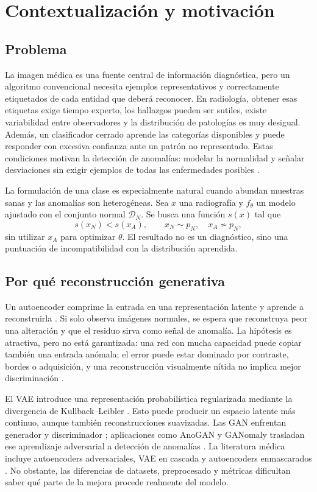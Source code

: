 \section{Contextualización y motivación}

\subsection{Problema}

La imagen médica es una fuente central de información diagnóstica, pero un
algoritmo convencional necesita ejemplos representativos y correctamente
etiquetados de cada entidad que deberá reconocer. En radiología, obtener esas
etiquetas exige tiempo experto, los hallazgos pueden ser sutiles, existe
variabilidad entre observadores y la distribución de patologías es muy
desigual. Además, un clasificador cerrado aprende las categorías disponibles y
puede responder con excesiva confianza ante un patrón no representado. Estas
condiciones motivan la detección de anomalías: modelar la normalidad y señalar
desviaciones sin exigir ejemplos de todas las enfermedades posibles
\cite{pang2021review,ruff2021unifying}.

La formulación de una clase es especialmente natural cuando abundan muestras
sanas y las anomalías son heterogéneas. Sea $x$ una radiografía y $f_\theta$ un
modelo ajustado con el conjunto normal $\mathcal{D}_{N}$. Se busca una función
$s(x)$ tal que
\[
  s(x_N) < s(x_A), \qquad x_N\sim p_N,\quad x_A\not\sim p_N,
\]
sin utilizar $x_A$ para optimizar $\theta$. El resultado no es un diagnóstico,
sino una puntuación de incompatibilidad con la distribución aprendida.

\subsection{Por qué reconstrucción generativa}

Un autoencoder comprime la entrada en una representación latente y aprende a
reconstruirla \cite{hinton2006reducing}. Si solo observa imágenes normales, se
espera que reconstruya peor una alteración y que el residuo sirva como señal de
anomalía. La hipótesis es atractiva, pero no está garantizada: una red con mucha
capacidad puede copiar también una entrada anómala; el error puede estar
dominado por contraste, bordes o adquisición, y una reconstrucción visualmente
nítida no implica mejor discriminación \cite{baur2021autoencoders}.

El VAE introduce una representación probabilística regularizada mediante la
divergencia de Kullback--Leibler \cite{kingma2014vae}. Esto puede producir un
espacio latente más continuo, aunque también reconstrucciones suavizadas. Las
GAN enfrentan generador y discriminador \cite{goodfellow2014gan}; aplicaciones
como AnoGAN y GANomaly trasladan ese aprendizaje adversarial a detección de
anomalías \cite{schlegl2017anogan,akcay2019ganomaly}. La literatura médica
incluye autoencoders adversariales, VAE en cascada y autoencoders enmascarados
\cite{zhang2022improved,guo2021cvad,georgescu2023masked}. No obstante, las
diferencias de datasets, preprocesado y métricas dificultan saber qué parte de
la mejora procede realmente del modelo.

